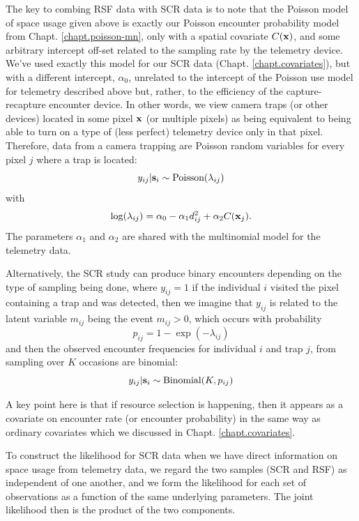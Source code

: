 The key to combing RSF data with SCR data is to note that the Poisson
model of space usage given above is exactly our Poisson encounter
probability model from Chapt. \ref{chapt.poisson-mn}, only with a
spatial covariate $C({\bf x})$, and some arbitrary intercept off-set
related to the sampling rate by the telemetry device.  We've used
exactly this model for our SCR data (Chapt. \ref{chapt.covariates}),
but with a different intercept, $\alpha_{0}$, unrelated to the
intercept of the Poisson use model for telemetry described above but,
rather, to the efficiency of the capture-recapture encounter device.
In other words, we view camera traps (or other devices) located in
some pixel ${\bf x}$ (or multiple pixels) as being equivalent to being
able to turn on a type of (less perfect) telemetry device only in that
pixel.
Therefore,
data from a camera trapping are Poisson random variables
for every pixel $j$ where a trap is located:
\[
y_{ij}|{\bf s}_{i} \sim \mbox{Poisson}( \lambda_{ij})
\]
with
\[
 \log(\lambda_{ij}) =  \alpha_{0} -\alpha_{1}
 d_{ij}^{2} +  \alpha_{2} C({\bf x}_{j}).
\]
The parameters $\alpha_{1}$ and $\alpha_{2}$ are shared with the
multinomial model for the telemetry data.

Alternatively,
the SCR study can produce binary
encounters depending on the type of sampling being done,
where $y_{ij} = 1$ if the individual $i$ visited
the pixel containing a trap and was detected, then we imagine that
$y_{ij}$ is related to the latent variable $m_{ij}$ being the event
$m_{ij}>0$, which occurs with probability
\begin{equation}
 p_{ij} = 1-\exp(- \lambda_{ij})
\label{rsf.eq.cloglog}
\end{equation}
and then the observed encounter frequencies for individual $i$ and trap $j$, from
sampling over $K$ occasions are binomial:
\[
 y_{ij}|{\bf s}_{i} \sim \mbox{Binomial}(K, p_{ij})
\]

A key point here is that if resource selection is happening, then it
appears as a covariate on encounter rate (or encounter
probability) in the same way as ordinary covariates which we discussed in
Chapt. \ref{chapt.covariates}.


To construct the likelihood for SCR data when we have
direct information on space usage
from telemetry data, we regard the two samples (SCR and RSF) as
independent of one another, and we
 form the likelihood for each set of observations as a function
of the same underlying parameters. The joint likelihood then is the
product of the two components.

